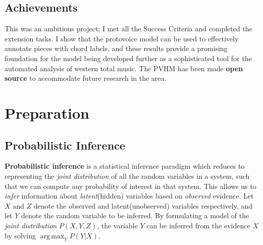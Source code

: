 \documentclass[12pt,a4paper,twoside,openright]{report} \usepackage[pdfborder={0 0 0}]{hyperref}    %
\DeclareMathOperator*{\argmax}{arg\,max} \DeclareMathOperator*{\argmin}{arg\,min}
\theoremstyle{definition} \newtheorem{definition}{Definition}[section]
\begin{document}
    \section{Achievements}

    This was an ambitious project; I met all the Success Criteria and completed the extension tasks. I show that the
    protovoice model can be used to effectively annotate pieces with chord labels, and these results provide a promising
    foundation for the model being developed further as a sophisticated tool for the automated analysis of western total
    music. The PVHM has been made \textbf{open source} to accommodate future research in the area.




    \chapter{Preparation}%

    \section{Probabilistic Inference}


    \textbf{Probabilistic inference} is a statistical inference paradigm which reduces to representing the \textit{joint
    distribution} of all the random variables in a system, such that we can compute any probability of interest in that
    system. This allows us to \textit{infer} information about \textit{latent}(hidden) variables based on
    \textit{observed} evidence. Let $X$ and $Z$ denote the observed and latent(unobserved) variables respectively, and
    let $Y$ denote the random variable to be inferred. By formulating a model of the \textit{joint distribution}
    $P(X,Y,Z)$, the variable $Y$ can be inferred from the evidence $X$ by solving $\argmax_Y P(Y|X)$. 
\end{document}
